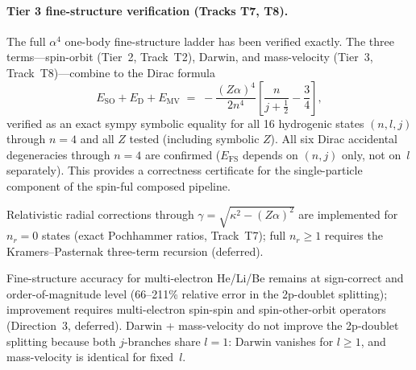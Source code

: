 \documentclass[aps,pra,twocolumn,superscriptaddress,longbibliography]{revtex4-2}
\begin{document}
\paragraph{Tier 3 fine-structure verification (Tracks T7, T8).}
The full $\alpha^4$ one-body fine-structure ladder has been verified
exactly.  The three terms---spin-orbit (Tier~2, Track~T2), Darwin, and
mass-velocity (Tier~3, Track~T8)---combine to the Dirac formula
\begin{equation}\label{eq:dirac_fs}
  E_{\mathrm{SO}} + E_{\mathrm{D}} + E_{\mathrm{MV}}
  \;=\; -\frac{(Z\alpha)^4}{2n^4}\left[\frac{n}{j+\tfrac{1}{2}}
        - \frac{3}{4}\right],
\end{equation}
verified as an exact sympy symbolic equality for all 16 hydrogenic
states $(n,l,j)$ through $n = 4$ and all $Z$ tested (including symbolic
$Z$).  All six Dirac accidental degeneracies through $n = 4$ are
confirmed ($E_{\mathrm{FS}}$ depends on $(n,j)$ only, not on~$l$
separately).  This provides a correctness certificate for the
single-particle component of the spin-ful composed pipeline.

Relativistic radial corrections through $\gamma = \sqrt{\kappa^2 -
(Z\alpha)^2}$ are implemented for $n_r = 0$ states (exact Pochhammer
ratios, Track~T7); full $n_r \geq 1$ requires the Kramers--Pasternak
three-term recursion (deferred).

Fine-structure accuracy for multi-electron He/Li/Be remains at
sign-correct and order-of-magnitude level (66--211\% relative error
in the 2p-doublet splitting); improvement requires multi-electron
spin-spin and spin-other-orbit operators (Direction~3, deferred).
Darwin + mass-velocity do not improve the 2p-doublet splitting
because both $j$-branches share $l = 1$: Darwin vanishes for $l \geq 1$,
and mass-velocity is identical for fixed~$l$.
\end{document}
